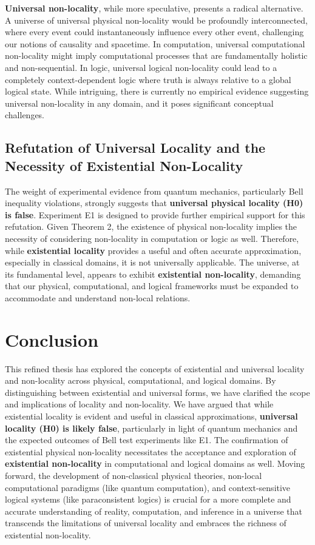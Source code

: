 \textbf{Universal non-locality}, while more speculative, presents a radical alternative.  A universe of universal physical non-locality would be profoundly interconnected, where every event could instantaneously influence every other event, challenging our notions of causality and spacetime.  In computation, universal computational non-locality might imply computational processes that are fundamentally holistic and non-sequential.  In logic, universal logical non-locality could lead to a completely context-dependent logic where truth is always relative to a global logical state. While intriguing, there is currently no empirical evidence suggesting universal non-locality in any domain, and it poses significant conceptual challenges.

\subsection{Refutation of Universal Locality and the Necessity of Existential Non-Locality}

The weight of experimental evidence from quantum mechanics, particularly Bell inequality violations, strongly suggests that \textbf{universal physical locality (H0) is false}. Experiment E1 is designed to provide further empirical support for this refutation.  Given Theorem 2, the existence of physical non-locality implies the necessity of considering non-locality in computation or logic as well.  Therefore, while \textbf{existential locality} provides a useful and often accurate approximation, especially in classical domains, it is not universally applicable.  The universe, at its fundamental level, appears to exhibit \textbf{existential non-locality}, demanding that our physical, computational, and logical frameworks must be expanded to accommodate and understand non-local relations.

\section{Conclusion}

This refined thesis has explored the concepts of existential and universal locality and non-locality across physical, computational, and logical domains. By distinguishing between existential and universal forms, we have clarified the scope and implications of locality and non-locality. We have argued that while existential locality is evident and useful in classical approximations, \textbf{universal locality (H0) is likely false}, particularly in light of quantum mechanics and the expected outcomes of Bell test experiments like E1.  The confirmation of existential physical non-locality necessitates the acceptance and exploration of \textbf{existential non-locality} in computational and logical domains as well.  Moving forward, the development of non-classical physical theories, non-local computational paradigms (like quantum computation), and context-sensitive logical systems (like paraconsistent logics) is crucial for a more complete and accurate understanding of reality, computation, and inference in a universe that transcends the limitations of universal locality and embraces the richness of existential non-locality.